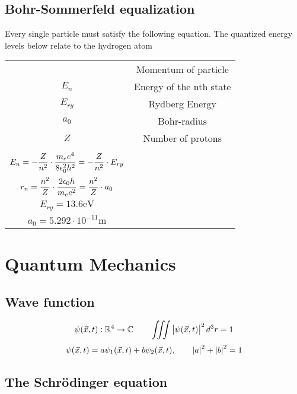 \documentclass{article}
\begin{document}
\begin{twocolumn}
\subsection{Bohr-Sommerfeld equalization}

Every single particle must satisfy the following equation. The quantized energy levels below relate to the hydrogen atom

\begin{tabular}{cc}
	\begin{dtabular}
		$p$ & Momentum of particle \\
		$E_n$ & Energy of the nth state \\
		$E_{ry}$ & Rydberg Energy \\
		$a_0$ & Bohr-radius \\
		$Z$ & Number of protons \\	
	\end{dtabular} &
	\begin{mtabular}{c}
		$\fmm \int_{length} p \cdot ds = n \cdot h \qquad n \in \mathbb{N}$ \\
		$\displaystyle E_n = -\frac{Z}{n^2} \cdot \frac{m_e e^4}{8 \epsilon_0^2 h^2} = - \frac{Z}{n^2} \cdot E_{ry} $ \\
		$\displaystyle r_n = \frac{n^2}{Z} \cdot \frac{2 \epsilon_0 h}{m_e e^2} = \frac{n^2}{Z} \cdot a_0$ \\
		$E_{ry} = 13.6 \si{\electronvolt}$ \\
		$a_0 = 5.292 \cdot 10^{-11} \si{\meter}$
	\end{mtabular}
\end{tabular}

\section{Quantum Mechanics}

\begin{donotbrake}
\subsection{Wave function}
$$\psi(\vec{x}, t): \mathbb{R}^4 \rightarrow \mathbb{C} \qquad \iiint \left| \psi(\vec{x},t) \right|^2 d^3r = 1 $$
$$\psi(\vec{x}, t) = a \psi_1(\vec{x},t) + b \psi_2(\vec{x}, t), \qquad \left| a \right|^2 + \left| b \right|^2 = 1$$
\end{donotbrake}

\begin{donotbrake}
\subsection{The Schrödinger equation}


\end{donotbrake}
\end{twocolumn}
\end{document}
